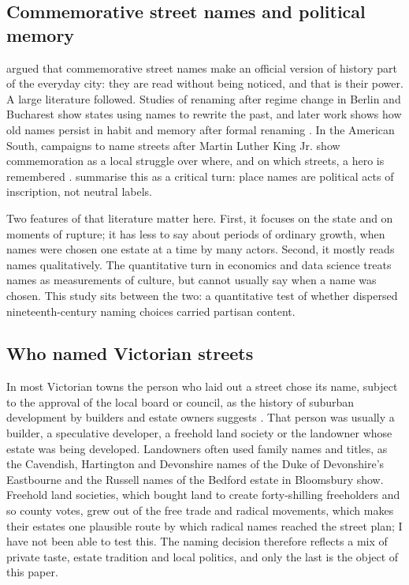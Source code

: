 \documentclass[11pt,a4paper]{article}
\begin{document}
\subsection{Commemorative street names and political memory}
\citet{azaryahu1996} argued that commemorative street names make an official version of history part of the everyday city: they are read without being noticed, and that is their power. A large literature followed. Studies of renaming after regime change in Berlin \citep{azaryahu1997} and Bucharest \citep{light2004} show states using names to rewrite the past, and later work shows how old names persist in habit and memory after formal renaming \citep{lightyoung2014}. In the American South, campaigns to name streets after Martin Luther King Jr. show commemoration as a local struggle over where, and on which streets, a hero is remembered \citep{alderman2000,alderman2003}. \citet{roseredwood2010} summarise this as a critical turn: place names are political acts of inscription, not neutral labels.

Two features of that literature matter here. First, it focuses on the state and on moments of rupture; it has less to say about periods of ordinary growth, when names were chosen one estate at a time by many actors. Second, it mostly reads names qualitatively. The quantitative turn in economics and data science \citep{oto2018,gutierrez2022,bancilhon2021} treats names as measurements of culture, but cannot usually say when a name was chosen. This study sits between the two: a quantitative test of whether dispersed nineteenth-century naming choices carried partisan content.

\subsection{Who named Victorian streets}
In most Victorian towns the person who laid out a street chose its name, subject to the approval of the local board or council, as the history of suburban development by builders and estate owners suggests \citep{dyos1961}. That person was usually a builder, a speculative developer, a freehold land society or the landowner whose estate was being developed. Landowners often used family names and titles, as the Cavendish, Hartington and Devonshire names of the Duke of Devonshire's Eastbourne and the Russell names of the Bedford estate in Bloomsbury show. Freehold land societies, which bought land to create forty-shilling freeholders and so county votes, grew out of the free trade and radical movements, which makes their estates one plausible route by which radical names reached the street plan; I have not been able to test this. The naming decision therefore reflects a mix of private taste, estate tradition and local politics, and only the last is the object of this paper.
\end{document}
